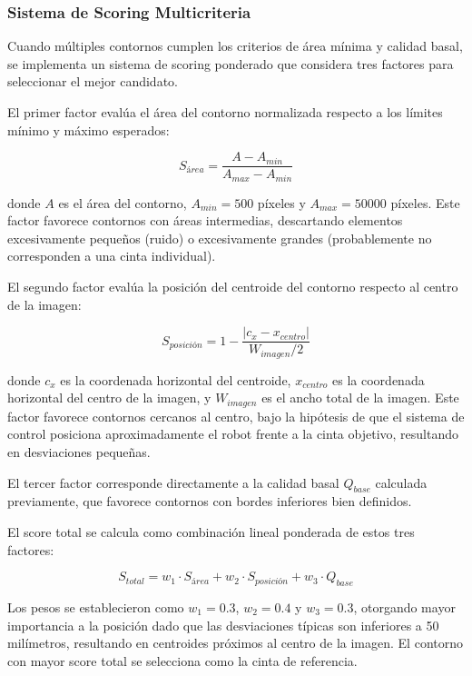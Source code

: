 \subsubsection{Sistema de Scoring Multicriteria}

Cuando múltiples contornos cumplen los criterios de área mínima y calidad basal, se implementa un sistema de scoring ponderado que considera tres factores para seleccionar el mejor candidato.

El primer factor evalúa el área del contorno normalizada respecto a los límites mínimo y máximo esperados:

\begin{equation}
S_{área} = \frac{A - A_{min}}{A_{max} - A_{min}}
\end{equation}

donde $A$ es el área del contorno, $A_{min} = 500$ píxeles y $A_{max} = 50000$ píxeles. Este factor favorece contornos con áreas intermedias, descartando elementos excesivamente pequeños (ruido) o excesivamente grandes (probablemente no corresponden a una cinta individual).

El segundo factor evalúa la posición del centroide del contorno respecto al centro de la imagen:

\begin{equation}
S_{posición} = 1 - \frac{|c_x - x_{centro}|}{W_{imagen}/2}
\end{equation}

donde $c_x$ es la coordenada horizontal del centroide, $x_{centro}$ es la coordenada horizontal del centro de la imagen, y $W_{imagen}$ es el ancho total de la imagen. Este factor favorece contornos cercanos al centro, bajo la hipótesis de que el sistema de control posiciona aproximadamente el robot frente a la cinta objetivo, resultando en desviaciones pequeñas.

El tercer factor corresponde directamente a la calidad basal $Q_{base}$ calculada previamente, que favorece contornos con bordes inferiores bien definidos.

El score total se calcula como combinación lineal ponderada de estos tres factores:

\begin{equation}
S_{total} = w_1 \cdot S_{área} + w_2 \cdot S_{posición} + w_3 \cdot Q_{base}
\end{equation}

Los pesos se establecieron como $w_1 = 0.3$, $w_2 = 0.4$ y $w_3 = 0.3$, otorgando mayor importancia a la posición dado que las desviaciones típicas son inferiores a 50 milímetros, resultando en centroides próximos al centro de la imagen. El contorno con mayor score total se selecciona como la cinta de referencia.

